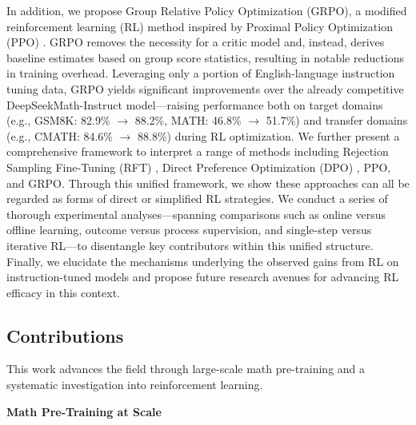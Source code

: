 In addition, we propose Group Relative Policy Optimization (GRPO), a modified reinforcement learning (RL) method inspired by Proximal Policy Optimization (PPO) \citep{schulman2017proximal}. GRPO removes the necessity for a critic model and, instead, derives baseline estimates based on group score statistics, resulting in notable reductions in training overhead. Leveraging only a portion of English-language instruction tuning data, GRPO yields significant improvements over the already competitive DeepSeekMath-Instruct model—raising performance both on target domains (e.g., GSM8K: 82.9\% $\rightarrow$ 88.2\%, MATH: 46.8\% $\rightarrow$ 51.7\%) and transfer domains (e.g., CMATH: 84.6\% $\rightarrow$ 88.8\%) during RL optimization. We further present a comprehensive framework to interpret a range of methods including Rejection Sampling Fine-Tuning (RFT) \citep{yuan2023scaling}, Direct Preference Optimization (DPO) \citep{dpo}, PPO, and GRPO. Through this unified framework, we show these approaches can all be regarded as forms of direct or simplified RL strategies. We conduct a series of thorough experimental analyses—spanning comparisons such as online versus offline learning, outcome versus process supervision, and single-step versus iterative RL—to disentangle key contributors within this unified structure. Finally, we elucidate the mechanisms underlying the observed gains from RL on instruction-tuned models and propose future research avenues for advancing RL efficacy in this context.

\subsection{Contributions}
This work advances the field through large-scale math pre-training and a systematic investigation into reinforcement learning.

\textbf{Math Pre-Training at Scale}

